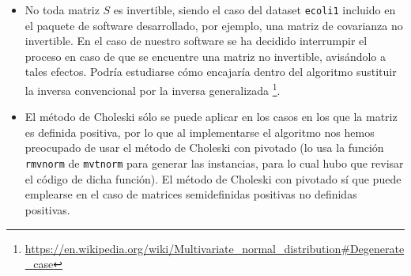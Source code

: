\begin{itemize} 
 \item No toda matriz $S$ es invertible, siendo el caso del dataset \texttt{ecoli1} incluido en el paquete de software 
 desarrollado, por ejemplo, una matriz de covarianza no invertible. En el caso de nuestro software se ha decidido interrumpir
 el proceso en caso de que se encuentre una matriz no invertible, avisándolo a tales efectos. Podría estudiarse cómo encajaría
 dentro del algoritmo sustituir la inversa convencional por la inversa generalizada 
 \footnote{\url{https://en.wikipedia.org/wiki/Multivariate_normal_distribution\#Degenerate_case}}.

 \item El método de Choleski sólo se puede aplicar en los casos en los que la matriz es definida positiva, por lo que 
 al implementarse el algoritmo nos hemos preocupado de usar el método de Choleski con pivotado (lo usa la función \texttt{rmvnorm}
 de \texttt{mvtnorm} para generar las instancias, para lo cual hubo que revisar el código de dicha función). El método
 de Choleski con pivotado sí que puede emplearse en el caso de matrices semidefinidas positivas no definidas positivas.
\end{itemize}

